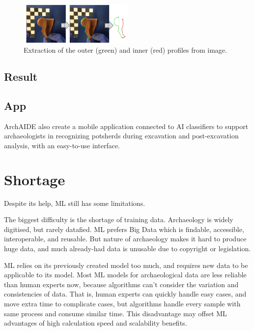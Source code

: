 \documentclass[journal]{IEEEtran}
\begin{document}
	\begin{figure}[htbp]
		\centering
		\includegraphics[width=0.5\textwidth]{./picture/process2.png}
		\caption{Extraction of the outer (green) and inner (red) profiles from image.}
		\label{process2}
	\end{figure} 
	
	\subsection{Result}
	
	
	
	\subsection{App}
	
	ArchAIDE also create a mobile application connected to AI classifiers to support archaeologists in recognizing potsherds during excavation and post-excavation analysis, with an easy-to-use interface.
	
	\section{Shortage}
	
	Despite its help, ML still has some limitations.
	
	The biggest difficulty is the shortage of training data. Archaeology is widely digitised, but rarely datafied\cite{Anichini2018BigAD}. ML prefers Big Data which is findable, accessible, interoperable, and reusable. But nature of archaeology makes it hard to produce huge data, and much already-had data is unusable due to copyright or legislation.\cite{heritage4010008}
	
	ML relies on its previously created model too much, and requires new data to be applicable to its model. Most ML models for archaeological data are less reliable than human experts now, because algorithms can't consider the variation and consistencies of data. That is, human experts can quickly handle easy cases, and move extra time to complicate cases, but algorithms handle every sample with same process and consume similar time. This disadvantage may offset ML advantages of high calculation speed and scalability benefits.\cite{bickler_2021}
	
\end{document}
